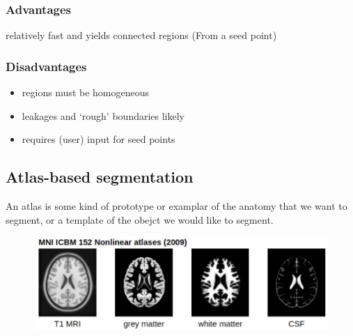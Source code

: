 \documentclass[11pt]{article}
\begin{document}
\begin{figure}[H]
    \centering
\end{figure}

\subsubsection{Advantages}

relatively fast and yields connected regions (From a seed point)

\subsubsection{Disadvantages}

\begin{itemize}
    \item regions must be homogeneous
    \item leakages and `rough' boundaries likely
    \item requires (user) input for seed points
\end{itemize}

\subsection{Atlas-based segmentation}

An atlas is some kind of prototype or examplar of the anatomy that we want to segment, or a template of the obejct we would like to segment. 

\begin{figure}[H]
    \centering
    \includegraphics[width=.7\linewidth]{figures/atlas.png}
\end{figure}
\end{document}
